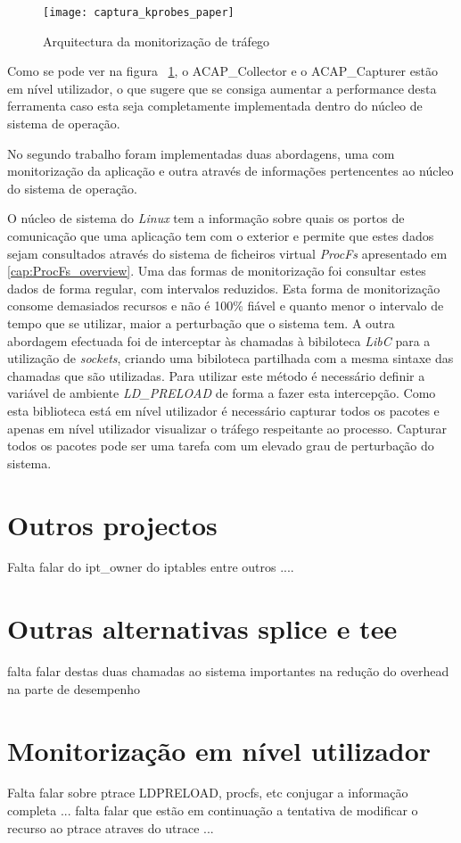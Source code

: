 \begin{figure}[h!]
       \centering
       \texttt{[image: captura\_kprobes\_paper]}
       \caption{Arquitectura da monitorização de tráfego}
	\label{fig:paper_capture_kprobes}
\end{figure}


Como se pode ver na figura ~\ref{fig:paper_capture_kprobes}, o ACAP\_Collector e o ACAP\_Capturer estão em nível utilizador, o que sugere que se consiga aumentar a performance desta ferramenta caso esta seja completamente implementada dentro do núcleo de sistema de operação.

No segundo trabalho foram implementadas duas abordagens, uma com monitorização da aplicação e outra através de informações pertencentes ao núcleo do sistema de operação.

O núcleo de sistema do \textit{Linux} tem a informação sobre quais os portos de comunicação que uma aplicação tem com o exterior e permite que estes dados sejam consultados através do sistema de ficheiros virtual \textit{ProcFs} apresentado em \ref{cap:ProcFs_overview}.
Uma das formas de monitorização foi consultar estes dados de forma regular, com intervalos reduzidos.
Esta forma de monitorização consome demasiados recursos e não é 100\% fiável e quanto menor o intervalo de tempo que se utilizar, maior a perturbação que o sistema tem.
A outra abordagem efectuada foi de interceptar às chamadas à bibiloteca \textit{LibC} para a utilização de \textit{sockets}, criando uma bibiloteca partilhada com a mesma sintaxe das chamadas que são utilizadas.
Para utilizar este método é necessário definir a variável de ambiente \textit{LD\_PRELOAD} de forma a fazer esta intercepção.
Como esta biblioteca está em nível utilizador é necessário capturar todos os pacotes e apenas em nível utilizador visualizar o tráfego respeitante ao processo.
Capturar todos os pacotes pode ser uma tarefa com um elevado grau de perturbação do sistema. 

\section{Outros projectos}

Falta falar do ipt\_owner do iptables entre outros ....


\section{Outras alternativas splice e tee}

falta falar destas duas chamadas ao sistema importantes na redução do overhead na parte de desempenho

\section{Monitorização em nível utilizador}

Falta falar sobre ptrace LDPRELOAD, procfs, etc conjugar a informação completa ... falta falar que estão em continuação a tentativa de modificar o recurso ao ptrace atraves do utrace ... 
